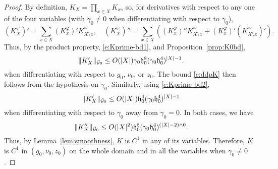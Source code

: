 \begin{proof}
By definition, $K_X = \prod_{x \in X} K_x$, so, for derivatives with respect to any one
of the four variables (with $\gamma_0 \neq 0$ when differentiating with respect to $\gamma_0$),
\begin{equation}
\label{e:KXprime}
(K^\varphi_X)'  = \sum_{x \in X} (K^\varphi_x)' K^\varphi_{X \setminus x}, \quad
(K^\varphi_X)'' = \sum_{x \in X} ((K^\varphi_x)'' K^\varphi_{X \setminus x} + (K^\varphi_x)' (K^\varphi_{X \setminus x})').
\end{equation}
Thus, by the product property, \eqref{e:Kprime-bd1}, and Proposition~\ref{prop:K0bd},
\begin{equation}
\|K'_X\|_{\mathcal{G}_0}
  \le
O(|X|) \gamma_0 \mathfrak{h}_0^8 (\gamma_0 \mathfrak{h}_0^4)^{|X|-1}.
\end{equation}
when differentiating with respect to $g_0$, $\nu_0$, or $z_0$.
The bound \eqref{e:ddpK} then follows from the hypothesis on $\gamma_0$.
Similarly, using \eqref{e:Kprime-bd2},
\begin{equation}
\|K'_X\|_{\mathcal{G}_0}
  \le
O(|X|) \mathfrak{h}_0^4 (\gamma_0 \mathfrak{h}_0^4)^{|X|-1}
\end{equation}
when differentiating with respect to $\gamma_0$ away from $\gamma_0 = 0$.
In both cases, we have
\begin{equation}
\|K''_X\|_{\mathcal{G}_0}
  \le
O(|X|^2) \mathfrak{h}_0^8 (\gamma_0 \mathfrak{h}_0^4)^{(|X|-2) \wedge 0}.
\end{equation}
Thus, by Lemma~\ref{lem:smoothness}, $K$ is $C^1$ in any of its variables.
Therefore, $K$ is $C^1$ in $(g_0, \nu_0, z_0)$ on the whole domain and in all the variables when $\gamma_0 \ne 0$.


\end{proof}
